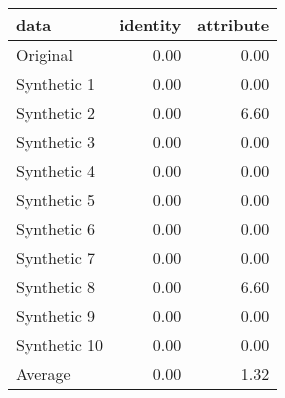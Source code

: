 \begin{tabular}{lrr}
  \toprule
data & identity & attribute \\ 
  \midrule
Original & 0.00 & 0.00 \\ 
  Synthetic 1 & 0.00 & 0.00 \\ 
  Synthetic 2 & 0.00 & 6.60 \\ 
  Synthetic 3 & 0.00 & 0.00 \\ 
  Synthetic 4 & 0.00 & 0.00 \\ 
  Synthetic 5 & 0.00 & 0.00 \\ 
  Synthetic 6 & 0.00 & 0.00 \\ 
  Synthetic 7 & 0.00 & 0.00 \\ 
  Synthetic 8 & 0.00 & 6.60 \\ 
  Synthetic 9 & 0.00 & 0.00 \\ 
  Synthetic 10 & 0.00 & 0.00 \\ 
  Average & 0.00 & 1.32 \\ 
   \bottomrule
\end{tabular}
